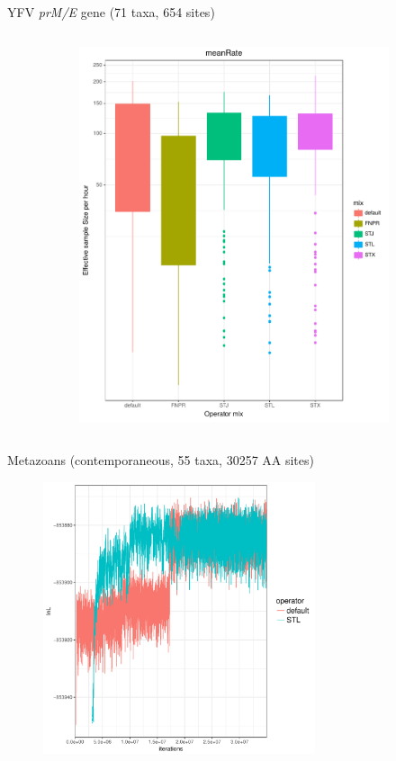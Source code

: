 \documentclass[newPxFont,numfooter,sectionpages]{beamer}
\begin{document}
\begin{frame}{YFV \textit{prM/E} gene (71 taxa, 654 sites)}
\begin{figure}
\begin{column}{0.5\textwidth}
\begin{figure}
     \includegraphics[width=\textwidth]{figures/ESS_hour_meanRate_YFV.pdf} \\
     \end{figure}
\end{column}
\end{figure}
\end{frame}

\begin{frame}{Metazoans (contemporaneous, 55 taxa, 30257 AA sites)}
\begin{figure}
	\includegraphics[width=\textwidth,height=8cm]{figures/comparison_metazoan.pdf} 
\end{figure}
\end{frame}
\end{document}

